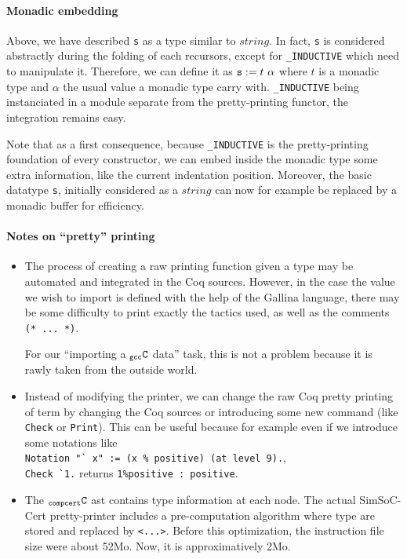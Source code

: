 \documentclass[a4paper, 11pt]{article}
\newcommand{\C}{$_{\tt compcert}{\tt C}$\xspace}
\newcommand{\gccC}{$_{\tt gcc}{\tt C}$\xspace}
\newcommand{\outworld}{the outside world\xspace}
\begin{document}
\paragraph{Monadic embedding}
Above, we have described \verb|s| as a type similar to $string$. In fact, \verb|s| is considered abstractly during the folding of each recursors, except for \verb|_INDUCTIVE| which need to manipulate it. Therefore, we can define it as $\verb|s| := t~\alpha$ where $t$ is a monadic type and $\alpha$ the usual value a monadic type carry with. \verb|_INDUCTIVE| being instanciated in a module separate from the pretty-printing functor, the integration remains easy.

Note that as a first consequence, because \verb|_INDUCTIVE| is the pretty-printing foundation of every constructor, we can embed inside the monadic type some extra information, like the current indentation position. Moreover, the basic datatype \verb|s|, initially considered as a $string$ can now for example be replaced by a monadic buffer for efficiency.

\paragraph{Notes on ``pretty'' printing}
\begin{itemize}
\item The process of creating a raw printing function given a type may be automated and integrated in the Coq sources. However, in the case the value we wish to import is defined with the help of the Gallina language, there may be some difficulty to print exactly the tactics used, as well as the comments \verb|(* ... *)|. 

For our ``importing a \gccC data'' task, this is not a problem because it is rawly taken from \outworld.
\item Instead of modifying the printer, we can change the raw Coq pretty printing of term by changing the Coq sources or introducing some new command (like \verb|Check| or \verb|Print|). This can be useful because for example even if we introduce some notations like \\
\verb|Notation "` x" := (x % positive) (at level 9).|, \\
\verb|Check `1.| returns \verb|1%positive : positive|.


\item The \C ast contains type information at each node. The actual SimSoC-Cert pretty-printer includes a pre-computation algorithm where type are stored and replaced by \verb|<...>|.
Before this optimization, the instruction file size were about 52Mo. Now, it is approximatively 2Mo.
\end{itemize}
\end{document}
